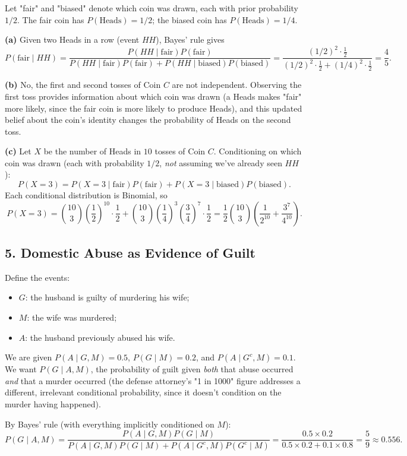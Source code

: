 \documentclass{article}
\begin{document}
Let "fair" and "biased" denote which coin was drawn, each with prior probability $1/2$. The fair coin has $P(\text{Heads})=1/2$; the biased coin has $P(\text{Heads})=1/4$.

\textbf{(a)} Given two Heads in a row (event $HH$), Bayes' rule gives
$$
P(\text{fair}\mid HH) = \frac{P(HH\mid\text{fair})P(\text{fair})}{P(HH\mid\text{fair})P(\text{fair}) + P(HH\mid\text{biased})P(\text{biased})}
= \frac{(1/2)^2\cdot\tfrac12}{(1/2)^2\cdot\tfrac12 + (1/4)^2\cdot\tfrac12} = \frac{4}{5}.
$$

\medskip
\textbf{(b)} No, the first and second tosses of Coin $C$ are not independent. Observing the first toss provides information about which coin was drawn (a Heads makes "fair" more likely, since the fair coin is more likely to produce Heads), and this updated belief about the coin's identity changes the probability of Heads on the second toss.

\medskip
\textbf{(c)} Let $X$ be the number of Heads in $10$ tosses of Coin $C$. Conditioning on which coin was drawn (each with probability $1/2$, \emph{not} assuming we've already seen $HH$):
$$
P(X=3) = P(X=3\mid\text{fair})P(\text{fair}) + P(X=3\mid\text{biased})P(\text{biased}).
$$
Each conditional distribution is Binomial, so
$$
P(X=3) = \binom{10}{3}\left(\frac12\right)^{10}\cdot\frac12 + \binom{10}{3}\left(\frac14\right)^3\left(\frac34\right)^7\cdot\frac12
= \frac12\binom{10}{3}\left(\frac{1}{2^{10}} + \frac{3^7}{4^{10}}\right).
$$

\subsection*{5. Domestic Abuse as Evidence of Guilt}

Define the events:
\begin{itemize}
\item $G$: the husband is guilty of murdering his wife;
\item $M$: the wife was murdered;
\item $A$: the husband previously abused his wife.
\end{itemize}
We are given $P(A\mid G,M) = 0.5$, $P(G\mid M)=0.2$, and $P(A\mid G^c,M)=0.1$. We want $P(G\mid A,M)$, the probability of guilt given \emph{both} that abuse occurred \emph{and} that a murder occurred (the defense attorney's "1 in 1000" figure addresses a different, irrelevant conditional probability, since it doesn't condition on the murder having happened).

By Bayes' rule (with everything implicitly conditioned on $M$):
$$
P(G\mid A,M) = \frac{P(A\mid G,M)P(G\mid M)}{P(A\mid G,M)P(G\mid M) + P(A\mid G^c,M)P(G^c\mid M)}
= \frac{0.5\times 0.2}{0.5\times 0.2 + 0.1\times 0.8} = \frac{5}{9} \approx 0.556.
$$
\end{document}
